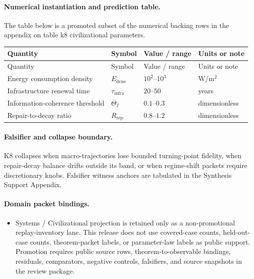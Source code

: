 \paragraph{Numerical instantiation and prediction table.}
The table below is a promoted subset of the numerical backing rows in the appendix on table k8 civilizational parameters.
\begin{longtable}{@{}L{0.27\textwidth}L{0.15\textwidth}L{0.24\textwidth}L{0.16\textwidth}@{}}
\toprule
Quantity & Symbol & Value / range & Units or note \\
\midrule
\endfirsthead
\toprule
Quantity & Symbol & Value / range & Units or note \\
\midrule
\endhead
Energy consumption density & $\scriptstyle E_{\mathrm{dens}}$ & $10^2\text{--}10^3$ & $\mathrm{W/m^2}$ \\
Infrastructure renewal time & $\scriptstyle \tau_{\mathrm{infra}}$ & $20\text{--}50$ & years \\
Information-coherence threshold & $\scriptstyle \Theta_I$ & $0.1\text{--}0.3$ & dimensionless \\
Repair-to-decay ratio & $\scriptstyle R_{\mathrm{rep}}$ & $0.8\text{--}1.2$ & dimensionless \\
\bottomrule
\end{longtable}

\paragraph{Falsifier and collapse boundary.}
K8 collapses when macro-trajectories lose bounded turning-point fidelity, when repair-decay balance drifts outside its band, or when regime-shift packets require discretionary knobs.
Falsifier witness anchors are tabulated in the Synthesis Support Appendix.

\paragraph{Domain packet bindings.}
\begin{itemize}[leftmargin=1.6em,nosep]
\item Systems / Civilizational projection is retained only as a non-promotional replay-inventory lane. This release does not use covered-case counts, held-out-case counts, theorem-packet labels, or parameter-law labels as public support. Promotion requires public source rows, theorem-to-observable bindings, residuals, comparators, negative controls, falsifiers, and source snapshots in the review package.
\end{itemize}

